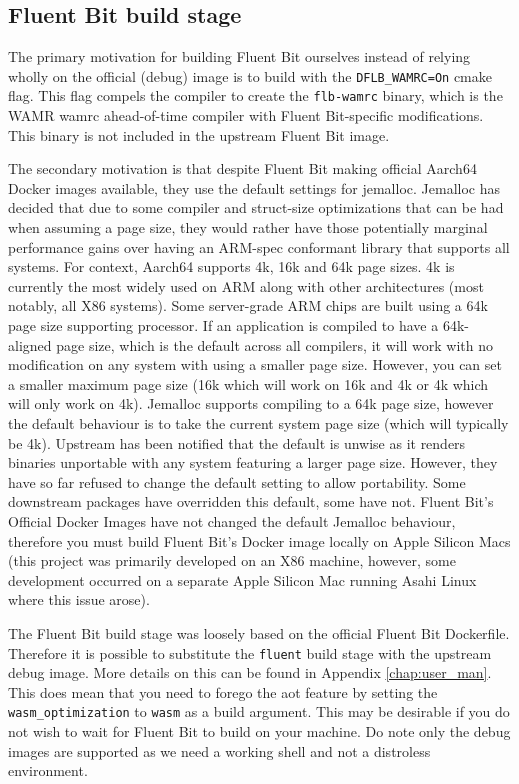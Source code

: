 \subsection{Fluent Bit build stage}
The primary motivation for building Fluent Bit ourselves instead of relying wholly on the official (debug) image is to build with the \texttt{DFLB\_WAMRC=On} cmake flag. This flag compels the compiler to create the \texttt{flb-wamrc} binary, which is the WAMR wamrc ahead-of-time compiler with Fluent Bit-specific modifications. This binary is not included in the upstream Fluent Bit image.

The secondary motivation is that despite Fluent Bit making official Aarch64 Docker images available, they use the default settings for \Gls{jemalloc}. Jemalloc has decided that due to some compiler and struct-size optimizations that can be had when assuming a page size, they would rather have those potentially marginal performance gains over having an ARM-spec conformant library that supports all systems. For context, Aarch64 supports 4k, 16k and 64k page sizes. 4k is currently the most widely used on ARM along with other architectures (most notably, all X86 systems). Some server-grade ARM chips are built using a 64k page size supporting processor. If an application is compiled to have a 64k-aligned page size, which is the default across all compilers, it will work with no modification on any system with using a smaller page size. However, you can set a smaller maximum page size (16k which will work on 16k and 4k or 4k which will only work on 4k). Jemalloc supports compiling to a 64k page size, however the default behaviour is to take the current system page size (which will typically be 4k). Upstream has been notified that the default is unwise as it renders binaries unportable with any system featuring a larger page size. However, they have so far refused to change the default setting to allow portability. Some downstream packages have overridden this default, some have not. Fluent Bit's Official Docker Images have not changed the default Jemalloc behaviour, therefore you must build Fluent Bit's Docker image locally on Apple Silicon Macs (this project was primarily developed on an X86 machine, however, some development occurred on a separate Apple Silicon Mac running Asahi Linux where this issue arose). 

The Fluent Bit build stage was loosely based on the official Fluent Bit Dockerfile. Therefore it is possible to substitute the \texttt{fluent} build stage with the upstream debug image. More details on this can be found in Appendix \ref{chap:user_man}. This does mean that you need to forego the \acrlong{aot} feature by setting the \texttt{wasm\_optimization} to \texttt{wasm} as a build argument. This may be desirable if you do not wish to wait for Fluent Bit to build on your machine. Do note only the debug images are supported as we need a working shell and not a distroless environment. 

